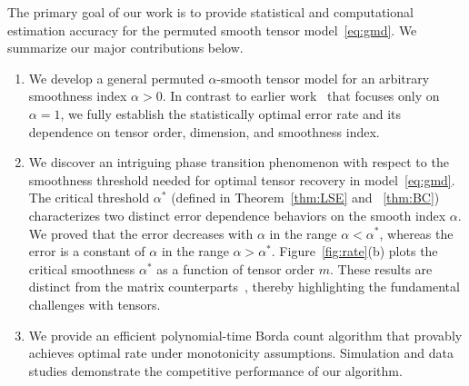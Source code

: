 \documentclass{article}
\theoremstyle{definition}
\begin{document}
 
The primary goal of our work is to provide statistical and computational estimation accuracy for the permuted smooth tensor model~\eqref{eq:gmd}.  
We summarize our major contributions below. 
\begin{enumerate}[label={(\alph*)},wide,topsep=-3pt,itemsep=0pt,parsep=1pt]
\item We develop a general permuted $\alpha$-smooth tensor model for an arbitrary smoothness index $\alpha>0$. In contrast to earlier work~\cite{balasubramanian2021nonparametric,li2019nearest} that focuses only on $\alpha=1$, we fully establish the statistically optimal error rate and its dependence on tensor order, dimension, and smoothness index. 
\item We discover an intriguing phase transition phenomenon with respect to the smoothness threshold needed for optimal tensor recovery in model~\eqref{eq:gmd}. The critical threshold $\alpha^*$ (defined in Theorem~\ref{thm:LSE} and ~\ref{thm:BC}) characterizes two distinct error dependence behaviors on the smooth index $\alpha$. We proved that the error decreases with $\alpha$ in the range $\alpha<\alpha^*$, whereas the error is a constant of $\alpha$ in the range $\alpha>\alpha^*$. Figure~\ref{fig:rate}(b) plots the critical smoothness $\alpha^*$ as a function of tensor order $m$. 
These results are distinct from the matrix counterparts~\citep{gao2016optimal,klopp2017oracle,gao2018minimax}, thereby highlighting the fundamental challenges with tensors. 


\item We provide an efficient polynomial-time Borda count algorithm that provably achieves optimal rate under monotonicity assumptions. Simulation and data studies demonstrate the competitive performance of our algorithm.
\end{enumerate}
\end{document}
